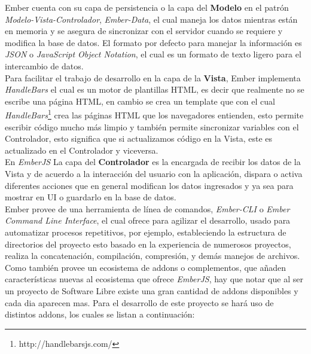 Ember cuenta con su capa de persistencia o la capa del \textbf{Modelo} en el patrón \emph{Modelo-Vista-Controlador}, \emph{Ember-Data}, el cual maneja los datos mientras están en memoria y se asegura de sincronizar con el servidor cuando se requiere y modifica la base de datos. El formato por defecto para manejar la información es \emph{JSON} o \emph{JavaScript Object Notation}, el cual es un formato de texto ligero para el intercambio de datos.\\


Para facilitar el trabajo de desarrollo en la capa de la \textbf{Vista}, Ember implementa \emph{HandleBars} el cual es un motor de plantillas HTML, es decir que realmente no se escribe una página HTML, en cambio se crea un template que con el cual \emph{HandleBars}\footnote{http://handlebarsjs.com/} crea las páginas HTML que los navegadores entienden, esto permite escribir código mucho más limpio y también permite sincronizar variables con el Controlador, esto significa que si actualizamos código en la Vista, este es actualizado en el Controlador y viceversa. \\




En \emph{EmberJS} La capa del \textbf{Controlador} es  la encargada de recibir los datos de la Vista y de acuerdo a la interacción del usuario con la aplicación, dispara o activa diferentes acciones que en general modifican los datos ingresados y ya sea para mostrar en UI o guardarlo en la base de datos.\\


Ember provee de una herramienta de línea de comandos, \emph{Ember-CLI} o \emph{Ember Command Line Interface}, el cual ofrece para agilizar el desarrollo, usado para automatizar procesos repetitivos, por ejemplo, estableciendo la estructura de directorios del proyecto esto basado en la experiencia de numerosos proyectos, realiza la concatenación, compilación, compresión, y demás manejos de archivos. Como también provee un ecosistema de addons o complementos, que añaden  características nuevas al ecosistema que ofrece \emph{EmberJS}, hay que notar que al ser un proyecto de Software Libre existe una gran cantidad de addons disponibles y cada dia aparecen mas.
Para el desarrollo de este proyecto se hará uso de distintos addons, los cuales se listan a continuación:

